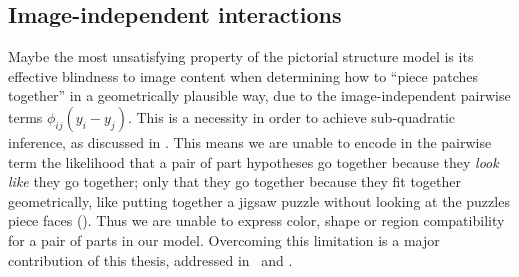 \subsection{Image-independent interactions}  Maybe the most unsatisfying 
property of the pictorial structure model is its effective blindness to image 
content when determining how to ``piece patches together'' in a geometrically 
plausible way, due to the image-independent pairwise terms 
$\phi_{ij}(y_i-y_j)$.  This is a necessity in order to achieve
sub-quadratic inference, as discussed in .  This means we are unable 
to encode in the pairwise term the likelihood that a pair of part hypotheses go 
together because they {\em look like} they go together; only that they go 
together because they fit together geometrically, like putting together a 
jigsaw puzzle without looking at the puzzles piece faces ().  
Thus we are unable to express color, shape or region compatibility for a pair 
of parts in our model.  Overcoming this limitation is a major contribution of 
this thesis, addressed in~ and .

